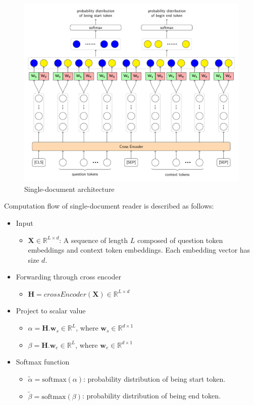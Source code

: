 \documentclass[3p, sort&compress, 12pt]{elsarticle}
\begin{document}
\begin{figure}[!htbp]
	\centering
	\includegraphics[scale=.7]{images/PDF/singleDocReader/singleDocReader.pdf}
	\caption{Single-document architecture}
	\label{fig:08}
\end{figure}
\par Computation flow of single-document reader is described as follows:
\begin{itemize}
	\item Input
	\begin{itemize}
		\item $\mathbf{X} \in \mathbb{R}^{L \times d}$: A sequence of length $L$ composed of question token embeddings and context token embeddings. Each embedding vector has size $d$.
	\end{itemize}
	\item Forwarding through cross encoder
	\begin{itemize}
		\item $\mathbf{H} = crossEncoder\left(\mathbf{X}\right) \in \mathbb{R}^{L \times d}$
	\end{itemize}
	\item Project to scalar value
	\begin{itemize}
		\item $\alpha = \mathbf{H}.\mathbf{w}_s \in \mathbb{R}^{L}$, where $\mathbf{w}_s \in \mathbb{R}^{d \times 1}$
		\item $\beta = \mathbf{H}.\mathbf{w}_e \in \mathbb{R}^{L}$, where $\mathbf{w}_e \in \mathbb{R}^{d \times 1}$
	\end{itemize}
	\item Softmax function
	\begin{itemize}
		\item $\tilde{\alpha} = \text{softmax}(\alpha)$: probability distribution of being start token.
		\item $\tilde{\beta} = \text{softmax}(\beta)$: probability distribution of being end token.
	\end{itemize}
\end{itemize}
\end{document}
